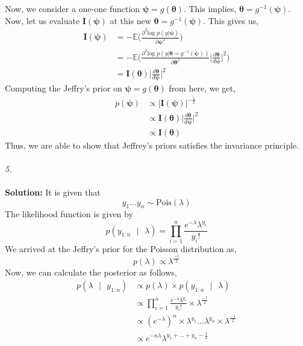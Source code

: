 \documentclass[11pt]{article}
\begin{document}
Now, we consider a one-one function $\bm{\psi} = g(\bm{\theta})$. This implies, $\bm{\theta} = g^{-1}(\bm{\psi})$. Now, let us evaluate $\mathbf{I}(\bm{\psi})$ at this new $\bm{\theta} = g^{-1}(\bm{\psi})$. This gives us,
\begin{equation}
  \nonumber
  \begin{aligned}
    \mathbf{I}(\bm{\psi}) & = -\mathbb{E}\bigg(\frac{\partial^{2} \text{log } p(y | \bm{\psi})}{\partial {\bm{\psi}}^{2}}\bigg)\\
    & = -\mathbb{E}\bigg(\frac{\partial^{2} \text{log } p(y | \bm{\theta} = g^{-1}(\bm{\psi}))}{\partial {\bm{\theta}}^{2}}\bigg|\frac{d \bm{\theta}}{d \bm{\psi}}\bigg|^{2}\bigg)\\
    & = \mathbf{I}(\bm{\theta}) \bigg|\frac{d \bm{\theta}}{d \bm{\psi}}\bigg|^{2}
  \end{aligned}
\end{equation}
Computing the Jeffry's prior on $\bm{\psi} = g(\bm{\theta})$ from here, we get,
\begin{equation}
  \nonumber
  \begin{aligned}
    p(\bm{\psi}) & \propto |\mathbf{I}(\bm{\psi})|^{-\frac{1}{2}}\\
    & \propto \mathbf{I}(\bm{\theta}) \bigg|\frac{d \bm{\theta}}{d \bm{\psi}}\bigg|^{2}\\
    & \propto \mathbf{I}(\bm{\theta})
  \end{aligned}
\end{equation}
Thus, we are able to show that Jeffrey's priors satisfies the invariance principle.\\ \\
\emph{5.}\\ \\
\textbf{Solution:} It is given that
\begin{equation}
  \nonumber
  y_{1} \dots y_{n} \sim \text{Pois}(\lambda)
\end{equation}
The likelihood function is given by
\begin{equation}
  \nonumber
  p(y_{1:n} \text{ }|\text{ } \lambda) = \prod_{i = 1}^{n} \frac{e^{-\lambda}\lambda^{y_{i}}}{y_{i}!}
\end{equation}
We arrived at the Jeffry's prior for the Poisson distribution as,
\begin{equation}
  \nonumber
  p(\lambda) \propto \lambda^{\frac{-1}{2}}
\end{equation}
Now, we can calculate the posterior as follows,
\begin{equation}
  \nonumber
  \begin{aligned}
    p(\lambda \text{ }|\text{ } y_{1:n}) & \propto p(\lambda) \times p(y_{1:n} \text{ }|\text{ } \lambda)\\
    &  \propto  \prod_{i = 1}^{n} \frac{e^{-\lambda}\lambda^{y_{i}}}{y_{i}!} \times \lambda^{\frac{-1}{2}}\\
    & \propto (e^{-\lambda})^{n} \times \lambda^{y_{1}} \dots \lambda^{y_{n}} \times \lambda^{\frac{-1}{2}}\\
    & \propto e^{-n \lambda} \lambda^{y_{1} + \dots + y_{n} - \frac{1}{2}}
  \end{aligned}
\end{equation}
\end{document}
